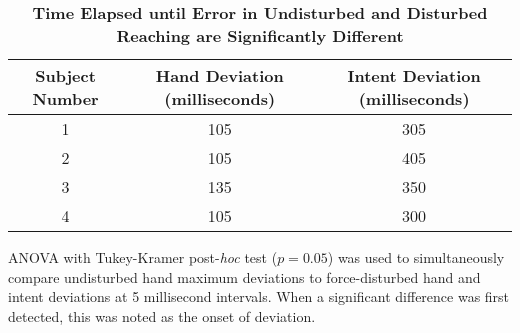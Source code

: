 \documentclass[10pt]{article}
\begin{document}
\begin{table}[!ht]
\caption{
\bf{Time Elapsed until Error in Undisturbed and Disturbed Reaching are Significantly Different}}
\begin{tabular}{|c|c|c|}
\hline
Subject Number &
Hand Deviation (milliseconds) &
Intent Deviation (milliseconds) \\ \hline
1 &
105 &
305 \\
2 &
105 &
405 \\
3 &
135 &
350 \\
4 &
105 &
300 \\ \hline
\end{tabular}
\begin{flushleft} ANOVA with Tukey-Kramer post-\textit{hoc} test ($p=0.05$) was used to simultaneously compare undisturbed hand maximum deviations to force-disturbed hand and intent deviations at 5 millisecond intervals. When  a significant difference was first detected, this was noted as the onset of deviation.
\end{flushleft}
\label{tab:onsets}
\end{table}
\end{document}
